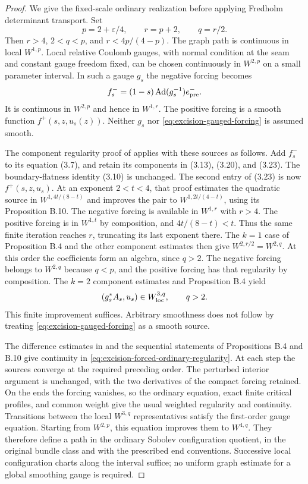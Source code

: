\documentclass[11pt]{amsart}
\theoremstyle{definition}
\theoremstyle{remark}
\theoremstyle{plain}
\begin{document}
\begin{proof}
We give the fixed-scale ordinary realization before applying
Fredholm determinant transport. Set
\[
 p=2+\varepsilon/4,\qquad r=p+2,\qquad q=r/2.
\]
Then $r>4$, $2<q<p$, and $r<4p/(4-p)$.
The graph path is continuous in local $W^{1,p}$.
Local relative Coulomb gauges, with normal condition at the
seam and constant gauge freedom fixed, can be chosen
continuously in $W^{2,p}$ on a small parameter interval.
In such a gauge $g_s$ the negative forcing becomes
\begin{equation}\label{eq:excision-gauged-forcing}
       f_s^-=(1-s)\operatorname{Ad}(g_s^{-1})e_{\rm pre}^- .
\end{equation}
It is continuous in $W^{2,p}$ and hence in $W^{1,r}$.
The positive forcing is a smooth function $f^+(s,z,u_s(z))$.
Neither $g_s$ nor \eqref{eq:excision-gauged-forcing} is
assumed smooth.

The component regularity proof of
\cite[\S3.1]{DaeFukLip21b} applies with these sources as
follows. Add $f_s^-$ to its equation (3.7), and retain its
components in (3.13), (3.20), and (3.23).
The boundary-flatness identity (3.10) is unchanged.
The second entry of (3.23) is now $f^+(s,z,u_s)$.
At an exponent $2<t<4$, that proof estimates the quadratic
source in $W^{1,4t/(8-t)}$ and improves the pair to
$W^{1,2t/(4-t)}$, using its Proposition B.10.
The negative forcing is available in $W^{1,r}$ with $r>4$.
The positive forcing is in $W^{1,t}$ by composition, and
$4t/(8-t)<t$. Thus the same finite iteration reaches $r$,
truncating its last exponent there. The $k=1$ case of
Proposition B.4 and the other component estimates then give
$W^{2,r/2}=W^{2,q}$. At this order the coefficients form
an algebra, since $q>2$. The negative forcing belongs to
$W^{2,q}$ because $q<p$, and the positive forcing has that
regularity by composition. The $k=2$ component estimates
and Proposition B.4 yield
\begin{equation}\label{eq:excision-forced-ordinary-regularity}
                    (g_s^*A_s,u_s)\in W^{3,q}_{\rm loc},
                              \qquad q>2.
\end{equation}
This finite improvement suffices. Arbitrary smoothness does
not follow by treating \eqref{eq:excision-gauged-forcing}
as a smooth source.

The difference estimates in \cite[\S3.2]{DaeFukLip21b}
and the sequential statements of Propositions B.4 and B.10
give continuity in \eqref{eq:excision-forced-ordinary-regularity}.
At each step the sources converge at the required preceding
order. The perturbed interior argument is unchanged, with
the two derivatives of the compact forcing retained.
On the ends the forcing vanishes, so the ordinary equation,
exact finite critical profiles, and common weight give the
usual weighted regularity and continuity.
Transitions between the local $W^{3,q}$ representatives
satisfy the first-order gauge equation. Starting from
$W^{2,p}$, this equation improves them to $W^{4,q}$.
They therefore define a path in the ordinary Sobolev
configuration quotient, in the original bundle class and
with the prescribed end conventions. Successive local
configuration charts along the interval suffice; no uniform
graph estimate for a global smoothing gauge is required.


\end{proof}
\end{document}
